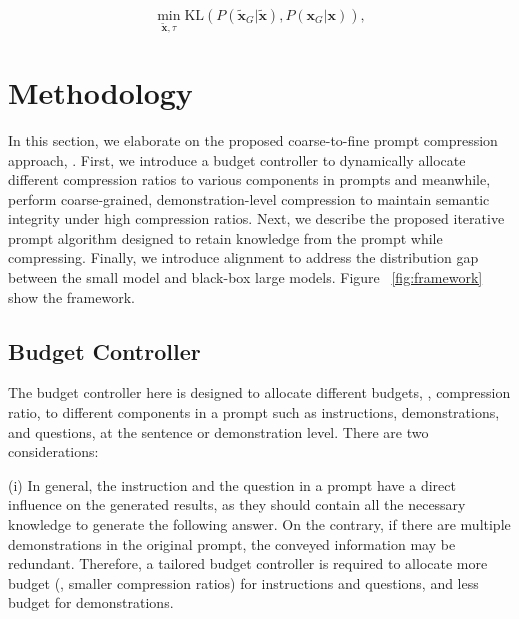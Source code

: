 \begin{equation}
\min_{\widetilde{\bm{x}}, \tau}
\text{KL}(P(\widetilde{\bm{x}}_G|\widetilde{\bm{x}}), P(\bm{x}_G|\bm{x})),
\end{equation}


\section{Methodology}

In this section, we elaborate on the proposed coarse-to-fine prompt compression approach, \textit{\sysname{}}. First, we introduce a budget controller to dynamically allocate different compression ratios to various components in prompts and meanwhile, perform coarse-grained, demonstration-level compression to maintain semantic integrity under high compression ratios. Next, we describe the proposed iterative prompt algorithm designed to retain knowledge from the prompt while compressing. Finally, we introduce alignment to address the distribution gap between the small model and black-box large models. 
Figure ~\ref{fig:framework} show the framework.

\subsection{Budget Controller}
The budget controller here is designed to allocate different budgets, \ie, compression ratio, to different components in a prompt such as instructions, demonstrations, and questions, at the sentence or demonstration level.
There are two considerations:

(i) In general, the instruction and the question in a prompt have a direct influence on the generated results, as they should contain all the necessary knowledge to generate the following answer.
On the contrary, if there are multiple demonstrations in the original prompt, the conveyed information may be redundant.
Therefore, a tailored budget controller is required to allocate more budget (\ie, smaller compression ratios) for instructions and questions, and less budget for demonstrations.

